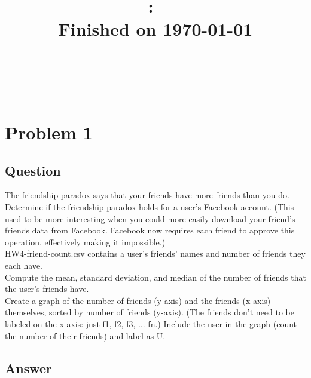 \documentclass[letterpaper,12pt]{article}
\title{
\vspace{2in}
\textmd{\textbf{\Class:\ \AssignmentTitle}}\\
\normalsize\vspace{0.1in}\small{Finished on \today}\\
\vspace{0.1in}\large{\textit{\Instructor\ }}
\vspace{3in}
}
\author{\textbf{\MyName} \\ \MyEmail}
\date{}
\begin{document}
\begin{titlepage}
\clearpage\maketitle
\thispagestyle{empty}
\end{titlepage}


\newpage
\clearpage
\tableofcontents
\lstlistoflistings
\listoffigures
\thispagestyle{empty}
\newpage
\section{Problem 1}

\subsection{Question}
\vspace*{10pt}

The friendship paradox says that your friends have more friends than you do. Determine if the friendship paradox holds for a user's Facebook account. (This used to be more interesting when you could more easily download your friend's friends data from Facebook. Facebook now requires each friend to approve this operation, effectively making it impossible.)\\

HW4-friend-count.csv contains a user's friends' names and number of friends they each have.\\

Compute the mean, standard deviation, and median of the number of friends that the user's friends have.\\

Create a graph of the number of friends (y-axis) and the friends (x-axis) themselves, sorted by number of friends (y-axis). (The friends don't need to be labeled on the x-axis: just f1, f2, f3, ... fn.) Include the user in the graph (count the number of their friends) and label as U.\\



\subsection{Answer}
\vspace{2mm}
\end{document}

